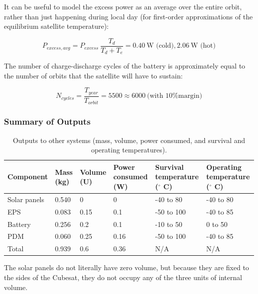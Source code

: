 \documentclass[12pt]{article}
\begin{document}
It can be useful to model the excess power as an average over the entire orbit, rather than just happening during local day (for first-order approximations of the equilibrium satellite temperature):

\begin{equation}
P_{excess,avg} = P_{excess} \: \frac{T_d}{T_d + T_e} = 0.40 \ \text{W (cold)}, 2.06 \ \text{W (hot)}
\label{eq:power-excess-avg}
\end{equation}

The number of charge-discharge cycles of the battery is approximately equal to the number of orbits that the satellite will have to sustain:

\begin{equation}
N_{cycles} = \frac{T_{year}}{T_{orbit}} = 5500 \approx 6000 \ \text{(with 10\% margin)}
\label{eq:power-num-cycles}
\end{equation}

			\subsubsection{Summary of Outputs}

\begin{table}[ht]\label{table:power-outputs}
\caption{Outputs to other systems (mass, volume, power consumed, and survival and operating temperatures).\cite{EPS manual} \cite{PDM manual} \cite{Battery manual} \cite{Solar panel datasheet}}
\begin{center}
    \begin{tabular}{|l|l|l|p{0.8in}|p{1in}|p{1.1in}|} \hline
Component & Mass (kg) & Volume (U) & Power consumed (W) & Survival temperature ($^\circ$ C) & Operating temperature ($^\circ$ C) \\ \hline \hline
Solar panels & 0.540 & 0 & 0 & -40 to 80 & -40 to 80 \\\hline
EPS & 0.083 & 0.15 & 0.1 & -50 to 100 & -40 to 85 \\\hline
Battery & 0.256 & 0.2 & 0.1 & -10 to 50 & 0 to 50 \\\hline
PDM & 0.060 & 0.25 & 0.16 & -50 to 100 & -40 to 85 \\\hline \hline
Total & 0.939 & 0.6 & 0.36 & N/A & N/A \\\hline
    \end{tabular}
\end{center}
\end{table}

The solar panels do not literally have zero volume, but because they are fixed to the sides of the Cubesat, they do not occupy any of the three units of internal volume.
\end{document}
